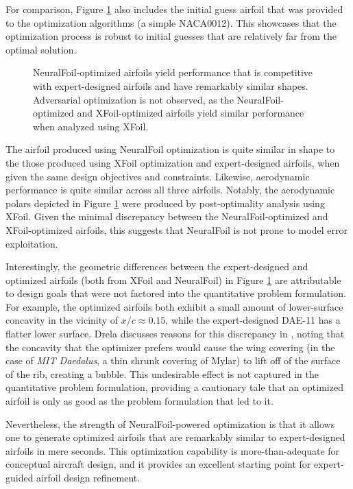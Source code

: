 \documentclass[conf]{new-aiaa}
\begin{document}
    For comparison, Figure \ref{fig:daedalus_optimized} also includes the initial guess airfoil that was provided to the optimization algorithms (a simple NACA0012). This showcases that the optimization process is robust to initial guesses that are relatively far from the optimal solution.

    \begin{figure}[h]
        \centering
        
        \caption{NeuralFoil-optimized airfoils yield performance that is competitive with expert-designed airfoils and have remarkably similar shapes. Adversarial optimization is not observed, as the NeuralFoil-optimized and XFoil-optimized airfoils yield similar performance when analyzed using XFoil.}
        \label{fig:daedalus_optimized}
    \end{figure}

    The airfoil produced using NeuralFoil optimization is quite similar in shape to the those produced using XFoil optimization and expert-designed airfoils, when given the same design objectives and constraints. Likewise, aerodynamic performance is quite similar across all three airfoils. Notably, the aerodynamic polars depicted in Figure \ref{fig:daedalus_optimized} were produced by post-optimality analysis using XFoil. Given the minimal discrepancy between the NeuralFoil-optimized and XFoil-optimized airfoils, this suggests that NeuralFoil is not prone to model error exploitation.

    Interestingly, the geometric differences between the expert-designed and optimized airfoils (both from XFoil and NeuralFoil) in Figure \ref{fig:daedalus_optimized} are attributable to design goals that were not factored into the quantitative problem formulation. For example, the optimized airfoils both exhibit a small amount of lower-surface concavity in the vicinity of $x/c \approx 0.15$, while the expert-designed DAE-11 has a flatter lower surface. Drela discusses reasons for this discrepancy in \cite{drela_pros_1998}, noting that the concavity that the optimizer prefers would cause the wing covering (in the case of \emph{MIT Daedalus}, a thin shrunk covering of Mylar) to lift off of the surface of the rib, creating a bubble. This undesirable effect is not captured in the quantitative problem formulation, providing a cautionary tale that an optimized airfoil is only as good as the problem formulation that led to it.

    Nevertheless, the strength of NeuralFoil-powered optimization is that it allows one to generate optimized airfoils that are remarkably similar to expert-designed airfoils in mere seconds. This optimization capability is more-than-adequate for conceptual aircraft design, and it provides an excellent starting point for expert-guided airfoil design refinement.
\end{document}
